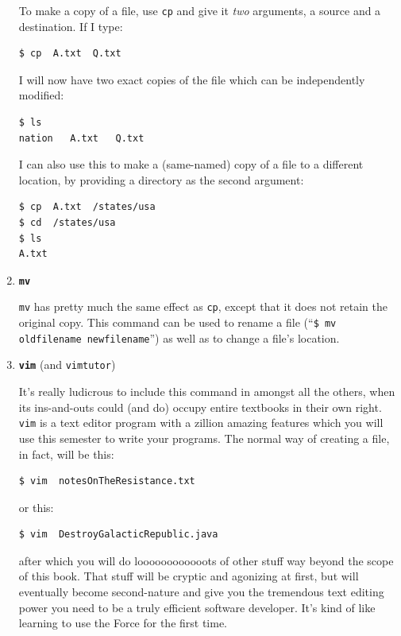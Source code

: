 \begin{enumerate}
To make a copy of a file, use \texttt{cp} and give it \textit{two} arguments,
a source and a destination. If I type:

\begin{Verbatim}[fontsize=\small]
$ cp  A.txt  Q.txt
\end{Verbatim}

I will now have two exact copies of the file which can be independently
modified:

\begin{Verbatim}[fontsize=\small]
$ ls
nation   A.txt   Q.txt
\end{Verbatim}

I can also use this to make a (same-named) copy of a file to a different
location, by providing a directory as the second argument:

\begin{Verbatim}[fontsize=\small]
$ cp  A.txt  /states/usa
$ cd  /states/usa
$ ls
A.txt
\end{Verbatim}

\bigline

\item \textbf{\texttt{mv}}

\texttt{mv} has pretty much the same effect as \texttt{cp}, except that it
does not retain the original copy. This command can be used to rename a file
(``\texttt{\$ mv oldfilename newfilename}'') as well as to change a file's
location.

\bigline

\item \textbf{\texttt{vim}} (and \texttt{vimtutor})

It's really ludicrous to include this command in amongst all the others, when
its ins-and-outs could (and do) occupy entire textbooks in their own right.
\texttt{vim} is a text editor program with a zillion amazing features which
you will use this semester to write your programs. The normal way of creating
a file, in fact, will be this:

\begin{Verbatim}[fontsize=\small]
$ vim  notesOnTheResistance.txt
\end{Verbatim}

or this:

\begin{Verbatim}[fontsize=\small]
$ vim  DestroyGalacticRepublic.java
\end{Verbatim}

after which you will do loooooooooooots of other stuff way beyond the scope of
this book. That stuff will be cryptic and agonizing at first, but will
eventually become second-nature and give you the tremendous text editing power
you need to be a truly efficient software developer. It's kind of like
learning to use the Force for the first time.


\end{enumerate}
